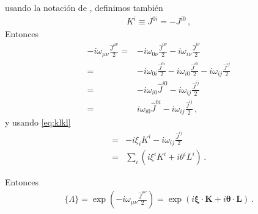 usando la notación de \cite{0812.1594}, definimos también
\begin{align}
  K^i\equiv J^{0i}=-J^{i0}\,,
\end{align}
Entonces
\begin{align}
-i\omega_{\mu\nu}\frac{\widehat{J}^{\mu\nu}}{2} =&-i\omega_{0\nu}\frac{\widehat{J}^{0\nu}}{2}
-i\omega_{i\nu}\frac{\widehat{J}^{i\nu}}{2}\nonumber\\
=&-i\omega_{0i}\frac{\widehat{J}^{0i}}{2}
-i\omega_{i0}\frac{\widehat{J}^{i0}}{2}
-i\omega_{ij}\frac{\widehat{J}^{ij}}{2}\nonumber\\
=&  -i\omega_{i0}\widehat{J}^{i0}
-i\omega_{ij}\frac{\widehat{J}^{ij}}{2}\nonumber\\
=&  i\omega_{i0}\widehat{J}^{0i}
-i\omega_{ij}\frac{\widehat{J}^{ij}}{2}\,,
\end{align}
y usando \eqref{eq:klkl}
\begin{align}
=&  -i\xi_{i}K^{i}-i\omega_{ij}\frac{\widehat{J}^{ij}}{2}\nonumber\\
=&\sum_i \left(i\xi^i K^i+i\theta^i L^i  \right)\,.
\end{align}
\begin{frame}
Entonces
\begin{align}
  \{\Lambda\}=\exp\left(-i\omega_{\mu\nu}\frac{\widehat{J}^{\mu\nu}}{2}\right)=
\exp\left( i\boldsymbol{\xi}\cdot\mathbf{K}+i\boldsymbol{\theta}\cdot\mathbf{L} \right)\,.
\end{align}


\end{frame}

